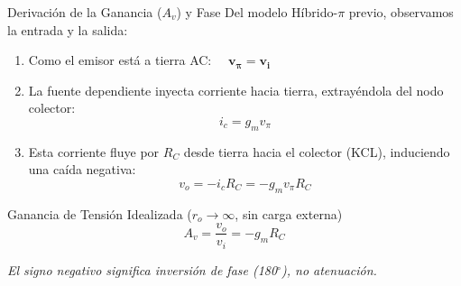 \documentclass[aspectratio=169, table, xcdraw]{beamer}
\begin{document}
\begin{frame}{Derivación de la Ganancia ($A_v$) y Fase}
    Del modelo Híbrido-$\pi$ previo, observamos la entrada y la salida:
    \begin{enumerate}
        \item Como el emisor está a tierra AC: $\quad \mathbf{v_\pi = v_i}$
        \item La fuente dependiente inyecta corriente hacia tierra, extrayéndola del nodo colector:
        \begin{equation*}
            i_c = g_m v_\pi
        \end{equation*}
        \item Esta corriente fluye por $R_C$ desde tierra hacia el colector (KCL), induciendo una caída negativa:
        \begin{equation*}
            v_o = -i_c R_C = -g_m v_\pi R_C
        \end{equation*}
    \end{enumerate}
    
    \begin{block}{Ganancia de Tensión Idealizada ($r_o \to \infty$, sin carga externa)}
        \begin{equation*}
            A_v = \frac{v_o}{v_i} = -g_m R_C
        \end{equation*}
    \end{block}
    \textit{El signo negativo significa inversión de fase (180$^\circ$), no atenuación.}
\end{frame}
\end{document}
